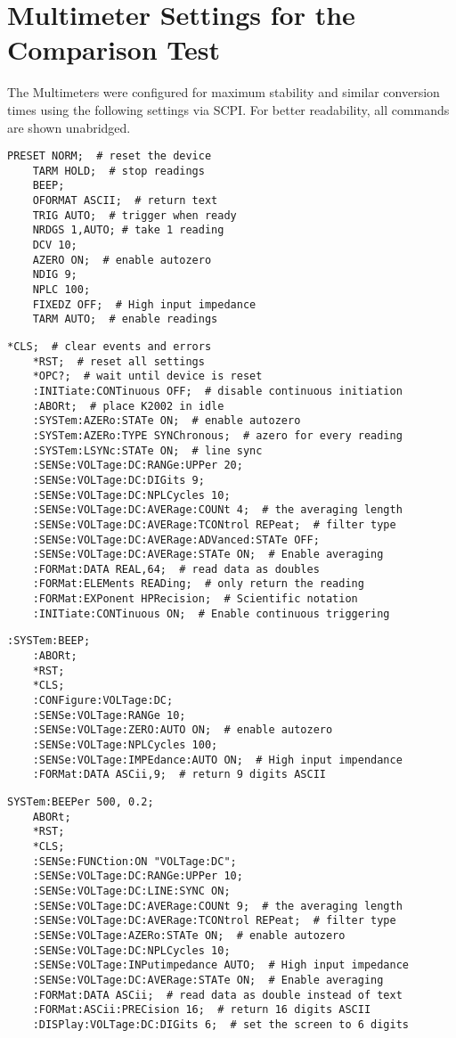 \documentclass[12pt]{book}
\begin{document}
\section{Multimeter Settings for the Comparison Test}
\label{appendix:dmm_test}
The Multimeters were configured for maximum stability and similar conversion times using the following settings via SCPI. For better readability, all commands are shown unabridged.

\begin{lstlisting}[title=HP 3458A]
    PRESET NORM;  # reset the device
    TARM HOLD;  # stop readings
    BEEP;
    OFORMAT ASCII;  # return text
    TRIG AUTO;  # trigger when ready
    NRDGS 1,AUTO; # take 1 reading
    DCV 10;
    AZERO ON;  # enable autozero
    NDIG 9;
    NPLC 100;
    FIXEDZ OFF;  # High input impedance
    TARM AUTO;  # enable readings
\end{lstlisting}

\begin{lstlisting}[title=Keithley Model 2002]
    *CLS;  # clear events and errors
    *RST;  # reset all settings
    *OPC?;  # wait until device is reset
    :INITiate:CONTinuous OFF;  # disable continuous initiation
    :ABORt;  # place K2002 in idle
    :SYSTem:AZERo:STATe ON;  # enable autozero
    :SYSTem:AZERo:TYPE SYNChronous;  # azero for every reading
    :SYSTem:LSYNc:STATe ON;  # line sync
    :SENSe:VOLTage:DC:RANGe:UPPer 20;
    :SENSe:VOLTage:DC:DIGits 9;
    :SENSe:VOLTage:DC:NPLCycles 10;
    :SENSe:VOLTage:DC:AVERage:COUNt 4;  # the averaging length
    :SENSe:VOLTage:DC:AVERage:TCONtrol REPeat;  # filter type
    :SENSe:VOLTage:DC:AVERage:ADVanced:STATe OFF;
    :SENSe:VOLTage:DC:AVERage:STATe ON;  # Enable averaging
    :FORMat:DATA REAL,64;  # read data as doubles
    :FORMat:ELEMents READing;  # only return the reading
    :FORMat:EXPonent HPRecision;  # Scientific notation
    :INITiate:CONTinuous ON;  # Enable continuous triggering
\end{lstlisting}

\begin{lstlisting}[title=Keysight 34470A]
    :SYSTem:BEEP;
    :ABORt;
    *RST;
    *CLS;
    :CONFigure:VOLTage:DC;
    :SENSe:VOLTage:RANGe 10;
    :SENSe:VOLTage:ZERO:AUTO ON;  # enable autozero
    :SENSe:VOLTage:NPLCycles 100;
    :SENSe:VOLTage:IMPEdance:AUTO ON;  # High input impendance
    :FORMat:DATA ASCii,9;  # return 9 digits ASCII
\end{lstlisting}

\begin{lstlisting}[title=Keithley DMM6500]
    SYSTem:BEEPer 500, 0.2;
    ABORt;
    *RST;
    *CLS;
    :SENSe:FUNCtion:ON "VOLTage:DC";
    :SENSe:VOLTage:DC:RANGe:UPPer 10;
    :SENSe:VOLTage:DC:LINE:SYNC ON;
    :SENSe:VOLTage:DC:AVERage:COUNt 9;  # the averaging length
    :SENSe:VOLTage:DC:AVERage:TCONtrol REPeat;  # filter type
    :SENSe:VOLTage:AZERo:STATe ON;  # enable autozero
    :SENSe:VOLTage:DC:NPLCycles 10;
    :SENSe:VOLTage:INPutimpedance AUTO;  # High input impedance
    :SENSe:VOLTage:DC:AVERage:STATe ON;  # Enable averaging
    :FORMat:DATA ASCii;  # read data as double instead of text
    :FORMat:ASCii:PRECision 16;  # return 16 digits ASCII
    :DISPlay:VOLTage:DC:DIGits 6;  # set the screen to 6 digits
\end{lstlisting}
\end{document}
